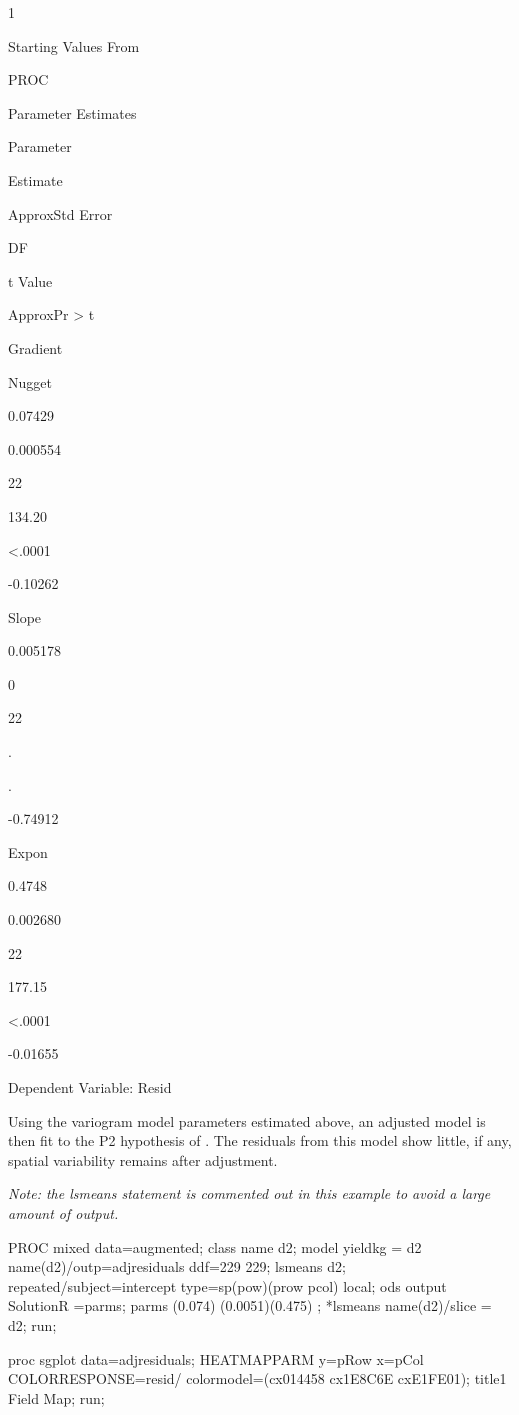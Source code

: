 \documentclass[
]{book}
\newenvironment{Shaded}{\begin{snugshade}}{\end{snugshade}}
\newcommand{\NormalTok}[1]{#1}
\begin{document}
1

Starting Values From

PROC

Parameter Estimates

Parameter

Estimate

ApproxStd Error

DF

t Value

ApproxPr \textgreater{} \textbar t\textbar{}

Gradient

Nugget

0.07429

0.000554

22

134.20

\textless.0001

-0.10262

Slope

0.005178

0

22

.

.

-0.74912

Expon

0.4748

0.002680

22

177.15

\textless.0001

-0.01655

Dependent Variable: Resid

Using the variogram model parameters estimated above, an adjusted model is then fit to the P2 hypothesis of \citet{Burgueno2018}. The residuals from this model show little, if any, spatial variability remains after adjustment.

\emph{Note: the lsmeans statement is commented out in this example to avoid a large amount of output.}

\begin{Shaded}
\begin{Highlighting}[]
\NormalTok{PROC mixed data=augmented;}
\NormalTok{    class name d2;}
\NormalTok{    model yieldkg = d2 name(d2)/outp=adjresiduals ddf=229 229;}
\NormalTok{    lsmeans d2;}
\NormalTok{    repeated/subject=intercept type=sp(pow)(prow pcol) local;}
\NormalTok{    ods output SolutionR =parms;}
\NormalTok{    parms (0.074) (0.0051)(0.475)  ;}
\NormalTok{    *lsmeans name(d2)/slice = d2;}
\NormalTok{run;}

\NormalTok{proc sgplot data=adjresiduals;}
\NormalTok{    HEATMAPPARM y=pRow x=pCol COLORRESPONSE=resid/ colormodel=(cx014458 cx1E8C6E cxE1FE01); }
\NormalTok{title1 \textquotesingle{}Field Map\textquotesingle{};}
\NormalTok{run;}
\end{Highlighting}
\end{Shaded}
\end{document}
